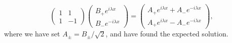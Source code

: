 \begin{example}
\begin{equation}
\begin{pmatrix}
    1 & 1\\
    1 & -1
  \end{pmatrix}
  \begin{pmatrix}
    B_{+}e^{i\lambda x}\\
    B_{-}e^{-i\lambda x}
  \end{pmatrix}
  =
  \begin{pmatrix}
    A_{+}e^{i\lambda x} + A_{-}e^{-i\lambda x}\\
    A_{+}e^{i\lambda x} - A_{-}e^{-i\lambda x}
  \end{pmatrix},
\end{equation}
%
where we have set $A_{\pm} = B_{\pm}/\sqrt{2}$, and have found the expected solution.
\end{example}


